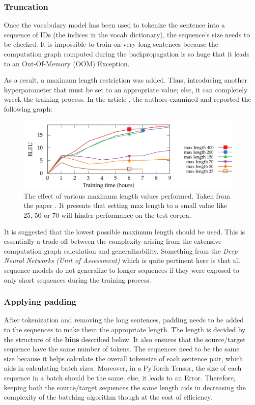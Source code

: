 \documentclass[12pt,a4paper,twoside,openright]{report}
\begin{document}
\subsubsection{Truncation}
Once the vocabulary model has been used to tokenize the sentence into a sequence of IDs (the indices in the vocab dictionary), the sequence's size needs to be checked. It is impossible to train on very long sentences because the computation graph computed during the backpropagation is so huge that it leads to an Out-Of-Memory (OOM) Exception.

As a result, a maximum length restriction was added. Thus, introducing another hyperparameter that must be set to an appropriate value; else, it can completely wreck the training process. In the article \cite{training-tips}, the authors examined and reported the following graph:

\begin{figure}
    \centering
    \includegraphics[width=\textwidth]{figs/fig4frompaper-trainingtips.PNG}
    \caption{The effect of various maximum length values performed. Taken from the paper \cite{training-tips}. It presents that setting max length to a small value like 25, 50 or 70 will hinder performance on the test corpra.}
    \label{fig:figure-4-from-paper}
\end{figure}

It is suggested that the lowest possible maximum length should be used. This is essentially a trade-off between the complexity arising from the extensive computation graph calculation and generalizability.
Something from the \textit{Deep Neural Networks (Unit of Assessment)} which is quite pertinent here is that all sequence models do not generalize to longer sequences if they were exposed to only short sequences during the training process.

\subsubsection{Applying padding}
After tokenization and removing the long sentences, padding needs to be added to the sequences to make them the appropriate length. The length is decided by the structure of the \textbf{bins} described below. It also ensures that the source/target sequence have the same number of tokens. The sequences need to be the same size because it helps calculate the overall tokensize of each sentence pair, which aids in calculating batch sizes. Moreover,  in a PyTorch Tensor, the size of each sequence in a batch should be the same; else, it leads to an Error. Therefore, keeping both the source/target sequences the same length aids in decreasing the complexity of the batching algorithm though at the cost of efficiency.
\end{document}
